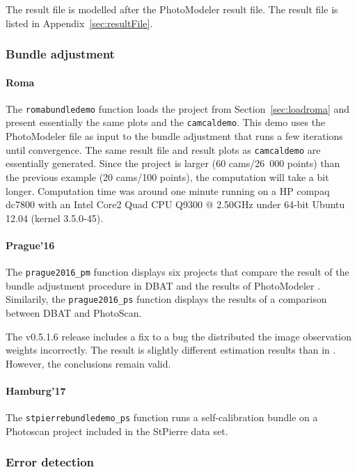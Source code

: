 \documentclass{article}
\begin{document}
The result file is modelled after the PhotoModeler result file.
The result file is listed in Appendix~\ref{sec:resultFile}.

\subsubsection{Bundle adjustment}

\paragraph{\sc Roma}
The \texttt{romabundledemo} function loads the project from
Section~\ref{sec:loadroma} and present essentially the same plots and
the \texttt{camcaldemo}. This demo uses the PhotoModeler file as input
to the bundle adjustment that runs a few iterations until convergence.
The same result file and result plots as \texttt{camcaldemo} are
essentially generated. Since the project is larger (60 cams/26~000
points) than the previous example (20 cams/100 points), the
computation will take a bit longer. Computation time was around one
minute running on a HP compaq dc7800 with an Intel Core2 Quad CPU
Q9300 @ 2.50GHz under 64-bit Ubuntu 12.04 (kernel 3.5.0-45).

\paragraph{\sc Prague'16}
The \texttt{prague2016\_pm} function displays six projects that
compare the result of the bundle adjustment procedure in DBAT and the
results of PhotoModeler \citep{Borlin2016:External}. Similarily, the
\texttt{prague2016\_ps} function displays the results of a comparison
between DBAT and PhotoScan.

The v0.5.1.6 release includes a fix to a bug the distributed the image
observation weights incorrectly. The result is slightly different
estimation results than in \citet{Borlin2016:External}. However, the
conclusions remain valid.

\paragraph{\sc Hamburg'17}
The \texttt{stpierrebundledemo\_ps} function runs a self-calibration
bundle on a Photoscan project included in the StPierre data set.

\subsubsection{Error detection}
\end{document}
